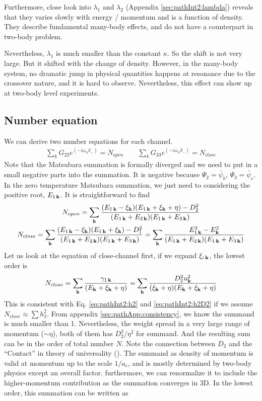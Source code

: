 Furthermore,  close look into $\lambda_1$ and $\lambda_2$ (Appendix \ref{sec:pathInt2:lambda}) reveals that they varies slowly with energy / momentum and is a function of density.  They describe  fundamental many-body effects, and do not have a counterpart in two-body problem.  

Nevertheless, $\lambda_1$ is much smaller than the  constant $\kappa$.  So the shift is not very large.  But it shifted with the change of density.  However, in the many-body system, no dramatic jump in physical quantities happens at resonance due to the crossover nature, and it is hard to observe.  Nevertheless, this effect can show up at two-body level experiments.  

\subsection{Number equation}
We can derive two number equations for each channel.  
\begin{gather*}
\sum_{k}G_{22}e^{(-i\omega_n\delta_-)}=N_{open}\qquad
\sum_{k}G_{33}e^{(-i\omega_n\delta_-)}=N_{close}
\end{gather*}
Note that the Matsubara summation is formally diverged and we need to put in a small negative parts into the summation.  It is negative because $\Psi_2=\bar\psi_b$, $\Psi_3=\bar\psi_c$.  In the zero temperature Matsubara summation, we just need to considering the positive root, $E_{1\,\mathbf{k}}$.  It is straightforward to find 
\begin{gather}
N_{open}=\sum_{\mathbf{k}}\frac{(E_{1\,\mathbf{k}}-\xi_{\mathbf{k}})(E_{1\,\mathbf{k}}+\xi_{\mathbf{k}}+\eta)-D_2^2}{(E_{1\,\mathbf{k}}+E_{2\,\mathbf{k}})(E_{1\,\mathbf{k}}+E_{3\,\mathbf{k}})}\\
N_{close}=\sum_{\mathbf{k}}\frac{(E_{1\,\mathbf{k}}-\xi_{\mathbf{k}})(E_{1\,\mathbf{k}}+\xi_{\mathbf{k}})-D_1^2}{(E_{1\,\mathbf{k}}+E_{2\,\mathbf{k}})(E_{1\,\mathbf{k}}+E_{3\,\mathbf{k}})}
=\sum_{\mathbf{k}}\frac{E_{1\,\mathbf{k}}^2-E_{\mathbf{k}}^2}{(E_{1\,\mathbf{k}}+E_{2\,\mathbf{k}})(E_{1\,\mathbf{k}}+E_{3\,\mathbf{k}})}\label{eq:pathInt2:numClose}
\end{gather}
Let us look at the equation of close-channel first, if we expand $\xi_{i\,\mathbf{k}}$, the lowest order is 
\begin{equation}
N_{close}=\sum_{\mathbf{k}}\frac{\gamma_{1\,\mathbf{k}}}{(E_{\mathbf{k}}+\xi_{\mathbf{k}}+\eta)}=\sum_{\mathbf{k}}\frac{D_{2}^2u_{\mathbf{k}}^{2}}{(\xi_{\mathbf{k}}+\eta)(E_{\mathbf{k}}+\xi_{\mathbf{k}}+\eta)}
\end{equation}
This is consistent with Eq. \ref{eq:pathInt2:h2} and \ref{eq:pathInt2:h2D2} if we assume $N_{close}\approx\sum{h_{2}^{2}}$.  From appendix \ref{sec:pathApp:consistency}, we know the summand is much smaller than 1.  Nevertheless, the weight spread in a very large range of momentum ($\sim\eta$),  both of them has $D_{2}^{2}/\eta^{2}$ for summand. And the resulting sum can be in the order of total number $N$. Note the connection between $D_{2}$ and the ``Contact'' in theory of universality (\cite{Tan2008-1,Tan2008-2}).  The summand as  density of momentum is valid at momentum up to the scale $1/a_{c}$, and is mostly determined by two-body physics except an overall factor.  furthermore, we can renormalize it to include the higher-momentum contribution as the summation converges in 3D.  In the lowest order, this summation can be written as 
